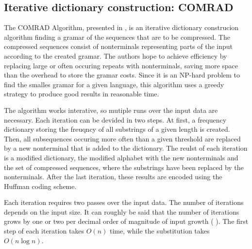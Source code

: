 \documentclass[acmtocl,acmnow]{article}
\begin{document}
\subsection{Iterative dictionary construction: COMRAD}

The COMRAD Algorithm, presented in \cite{Kur}, is an iterative dictionary construcion algorithm finding a gramar of the
sequences that are to be compressed. The compressed sequences consist of nonterminals representing parts of the input
according to the created gramar. The authors hope to achieve efficiency by replacing large or often occuring repeats 
with nonterminals, saving more space than the overhead to store the gramar costs. Since it is an NP-hard problem to find
the smalles gramar for a given language, this algorithm uses a greedy strategy to produce good results in reasonable time.

The algorithm works interative, so mutiple runs over the input data are necessary. Each iteration can be devided in two
steps. At first, a frequency
dictionary storing the freuqncy of all substrings of a given length is created. Then, all subsequences occuring more often
than a given threshold are replaced by a new nonterminal that is added to the dictionary. The reulst of each iteration is
a modified dictionary, the modified alphabet with the new nonterminals and the set of compressed sequences, where the
substrings have been replaced by the nonterminals. After the last iteration, these results are encoded using the
Huffman coding scheme.

Each iteration requires two passes over the input data. The number of iterations depends on the input size. It can 
roughly be said that the number of iterations grows by one or two per decimal order of magnitude of input growth (
\cite{Kur}). The first step of each iteration takes $O(n)$ time, while the substitution takes $O(n \log n)$.
\end{document}
